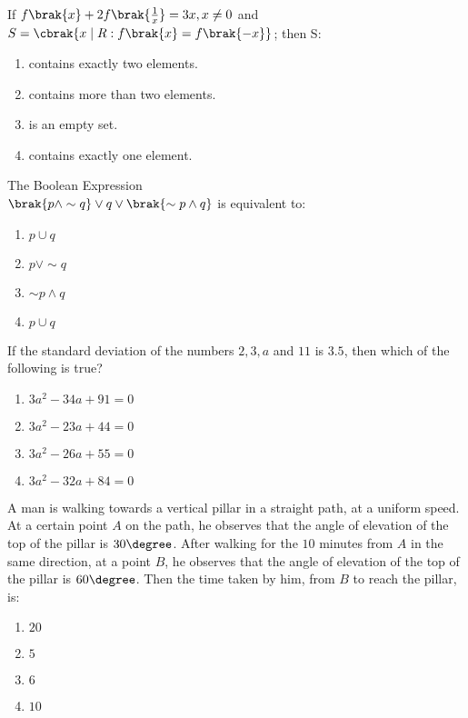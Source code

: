     \item If $f\brak{x} + 2f\brak{\frac{1}{x}} =3x, x\neq 0$ and\\
            $S=\cbrak{x\mid R: f\brak{x}=f\brak{-x}}$; then S:
             \hfill{}
            \begin{enumerate}
                \item contains exactly two elements.
                \item contains more than two elements.
                \item is an empty set.
                \item contains exactly one element.
            \end{enumerate}
    \item The Boolean Expression\\ $\brak{p\wedge\sim q}\vee q\vee\brak{\sim p\wedge q}$ is equivalent to: \hfill{}
    \begin{enumerate}
        \item $p\cup q$
        \item $p\vee\sim q$
        \item $\sim p\wedge q$
        \item $p\cup q$
    \end{enumerate}
\item If the standard deviation of the numbers $2,3,a$ and $11$ is $3.5$, then which of the following is true? \hfill{} 
\begin{enumerate}
    \item $3a^2-34a+91=0$
    \item $3a^2-23a+44=0$
    \item $3a^2-26a+55=0$
    \item $3a^2-32a+84=0$
\end{enumerate}
    \item A man is walking towards a vertical pillar in a straight path, at a uniform speed. At a certain point $A$ on the path, he observes that the angle of elevation of the top of the pillar is $30\degree$. After walking for the $10$ minutes from $A$ in the same direction, at a point $B$, he observes that the angle of elevation of the top of the pillar is $60\degree$. Then the time taken  by him, from $B$ to reach the pillar, is: \hfill{}
    \begin{enumerate}
        \item $20$
        \item $5$
        \item $6$
        \item $10$ 
    \end{enumerate}
